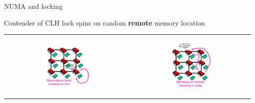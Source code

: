 \begin{frame}[fragile,t]{NUMA and locking}

Contender of CLH lock spins on random \textbf{remote} memory location

\begin{tabular}{cc}
\begin{center} \includegraphics[width=0.4\textwidth]{./pics/numa/148.png} \end{center} 
&
\begin{center} \includegraphics[width=0.4\textwidth]{./pics/numa/149.png} \end{center} 
\end{tabular}

\end{frame}


